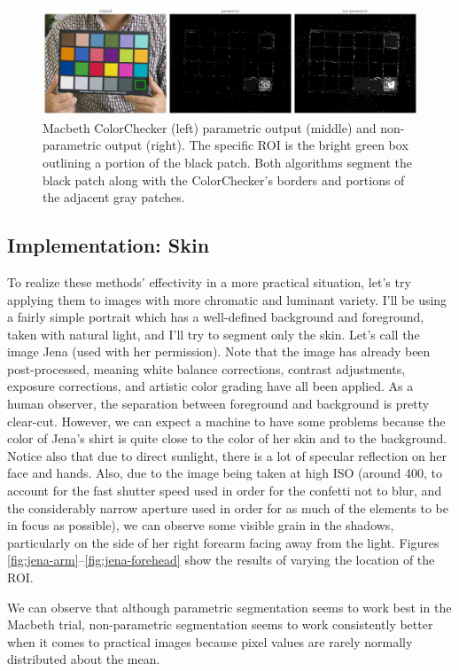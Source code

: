 \documentclass[12pt,a4paper]{article}
\begin{document}
\begin{figure}[htb]
	\centering
	\includegraphics[width=\textwidth]{mac_black_out.png}
	\caption{Macbeth ColorChecker (left) parametric output (middle) and non-parametric output (right). The specific ROI is the bright green box outlining a portion of the black patch. Both algorithms segment the black patch along with the ColorChecker's borders and portions of the adjacent gray patches.}
	\label{fig:macbeth-black}
\end{figure}

\clearpage
\subsection{Implementation: Skin}
To realize these methods' effectivity in a more practical situation, let's try applying them to images with more chromatic and luminant variety. I'll be using a fairly simple portrait which has a well-defined background and foreground, taken with natural light, and I'll try to segment only the skin. Let's call the image Jena (used with her permission). Note that the image has already been post-processed, meaning white balance corrections, contrast adjustments, exposure corrections, and artistic color grading have all been applied. As a human observer, the separation between foreground and background is pretty clear-cut. However, we can expect a machine to have some problems because the color of Jena's shirt is quite close to the color of her skin and to the background. Notice also that due to direct sunlight, there is a lot of specular reflection on her face and hands. Also, due to the image being taken at high ISO (around 400, to account for the fast shutter speed used in order for the confetti not to blur, and the considerably narrow aperture used in order for as much of the elements to be in focus as possible), we can observe some visible grain in the shadows, particularly on the side of her right forearm facing away from the light. Figures \ref{fig:jena-arm}--\ref{fig:jena-forehead} show the results of varying the location of the ROI.

We can observe that although parametric segmentation seems to work best in the Macbeth trial, non-parametric segmentation seems to work consistently better when it comes to practical images because pixel values are rarely normally distributed about the mean.
\end{document}
